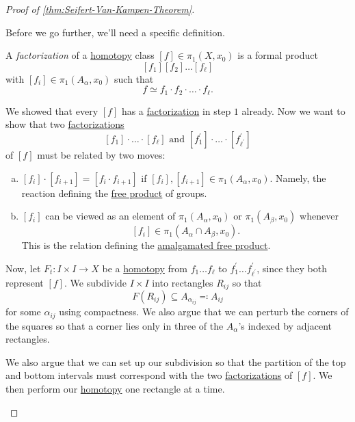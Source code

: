 \begin{proof}[Proof of \autoref{thm:Seifert-Van-Kampen-Theorem}]
\begin{enumerate}
		      Before we go further, we'll need a specific definition.
		      \begin{definition}[Factorization]\label{def:factorization}
			      A \emph{factorization} of a \hyperref[def:homotopy]{homotopy} class \([f]\in \pi _1(X, x_{0})\) is a formal product
			      \[
				      [f_1][f_2]\dots [f_{\ell }]
			      \]
			      with \([f_{i}]\in \pi _1(A_\alpha , x_0)\) such that
			      \[
				      f\simeq f_1\cdot f_2\cdot\dots \cdot f_{\ell}.
			      \]
		      \end{definition}
		      We showed that every \([f]\) has a \hyperref[def:factorization]{factorization} in step \(1\) already. Now we want to show that two \hyperref[def:factorization]{factorizations}
		      \[
			      [f_{1}]\cdot \dots \cdot[f_{\ell }] \text{ and } [f_{1} ^\prime ]\cdot \dots \cdot[f_{\ell ^\prime } ^\prime ]
		      \]
		      of \([f]\) must be related by two moves:
		      \begin{enumerate}[(a)]
			      \item \([f_{i}]\cdot[f_{i+1}] = [f_{i}\cdot f_{i+1}]\) if \([f_{i}], [f_{i+1}]\in \pi _1(A_\alpha , x_0)\). Namely, the reaction defining the \hyperref[def:free-product-with-amalgamation]{free product} of groups.
			      \item \([f_{i}]\) can be viewed as an element of \(\pi _1(A_\alpha , x_{0})\) or \(\pi _1(A_\beta , x_0)\) whenever
			            \[
				            [f_{i}]\in \pi _1(A_\alpha \cap A_\beta , x_{0}).
			            \]
			            This is the relation defining the \hyperref[def:free-product-with-amalgamation]{amalgamated free product}.
		      \end{enumerate}
		      Now, let \(F_{t}\colon I\times I\to X\) be a \hyperref[def:homotopy]{homotopy} from \(f_1 \dots f_{\ell } \) to \(f_1 ^\prime \dots f ^\prime _{\ell ^\prime } \), since they both represent \([f]\). We subdivide \(I\times I\) into rectangles \(R_{ij}\) so that
		      \[
			      F(R_{ij})\subseteq A_{\alpha _{ij}}\eqqcolon A_{ij}
		      \]
		      for some \(\alpha _{ij}\) using compactness. We also argue that we can perturb the corners of the squares so that a corner lies only in three of the \(A_\alpha \)'s indexed by adjacent rectangles.
		      \begin{figure}[H]
			      \centering
			      \label{fig:pf:Seifert-Van-Kampen-thm-1}
		      \end{figure}
		      We also argue that we can set up our subdivision so that the partition of the top and bottom intervals must correspond with the two \hyperref[def:factorization]{factorizations} of \([f]\). We then perform our \hyperref[def:homotopy]{homotopy} one rectangle at a time.
		      \begin{figure}[H]
			      \centering
			      \label{fig:pf:Seifert-Van-Kampen-thm-2}
		      \end{figure}

\end{enumerate}
\end{proof}

